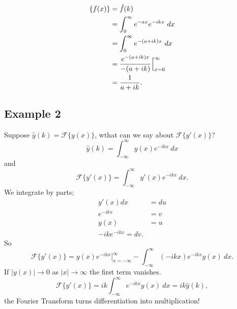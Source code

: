 \documentclass[cm]{article}
\newcommand{\fhat}{\hat{f}}
\newcommand{\yhat}{\hat{y}}
\begin{document}
\begin{align*}
\mathscr \{f(x)\} &= \fhat(k) \\
&= \int_{0}^{\infty} e^{-ax} e^{-i k x} ~dx \\
&= \int_0^{\infty} e^{-(a + ik)x}~dx \\
&= \frac{e^{-(a+ik)x}}{-(a+ik)} \Big[_{x = 0}^{\infty} \\
&= \frac{1}{a + ik}.
\end{align*}
\subsection{Example 2}
Suppose $\yhat(k) = \mathscr F \{y(x) \}$, wthat can we say about $\mathscr F \{ y'(x) \}$?
$$\yhat(k) = \int_{- \infty}^{\infty} y(x) e^{-i k x}~dx$$
and
$$ \mathscr F \{y'(x)\} = \int_{-\infty}^{\infty} y'(x) e^{-i kx }~dx.$$
We integrate by parts;
\begin{align*}
y'(x) dx &= du \\
e^{-ikx} &= v \\
y(x) &= u \\
-ike^{-ikx} = dv.
\end{align*}
So
$$ \mathscr F \{y'(x)\} = y(x) e^{-ikx} \big[_{x = - \infty}^{\infty} - \int_{-\infty}^{\infty} (-ikx)e^{-ikx} y(x)~dx.$$
If $|y(x)| \to 0$ as $|x| \to \infty$ the first term vanishes.
$$\mathscr F \{ y'(x) \} = ik \int_{- \infty}^{\infty} e^{-ikx} y(x)~dx = ik \yhat(k),$$
the Fourier Transform turns differentiation into multiplication!
\end{document}
